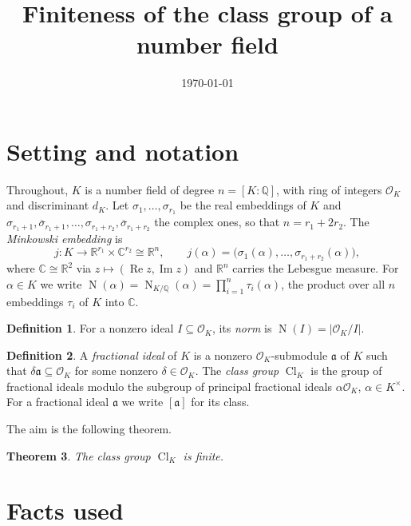 \documentclass[11pt]{amsart}
\title{Finiteness of the class group of a number field}
\date{\today}
\newtheorem{theorem}{Theorem}[section]
\theoremstyle{definition}
\newtheorem{definition}[theorem]{Definition}
\theoremstyle{remark}
\newcommand{\Q}{\mathbb{Q}}
\newcommand{\R}{\mathbb{R}}
\newcommand{\C}{\mathbb{C}}
\newcommand{\OK}{\mathcal{O}_K}
\newcommand{\Cl}{\operatorname{Cl}}
\newcommand{\Nm}{\operatorname{N}}
\begin{document}
\maketitle

\section{Setting and notation}\label{sec:setting}

Throughout, $K$ is a number field of degree $n = [K:\Q]$, with ring of
integers $\OK$ and discriminant $d_K$. Let $\sigma_1, \dots, \sigma_{r_1}$ be
the real embeddings of $K$ and
$\sigma_{r_1+1}, \overline{\sigma}_{r_1+1}, \dots, \sigma_{r_1+r_2},
\overline{\sigma}_{r_1+r_2}$ the complex ones, so that $n = r_1 + 2r_2$. The
\emph{Minkowski embedding} is
\[
  j \colon K \to \R^{r_1} \times \C^{r_2} \cong \R^n, \qquad
  j(\alpha) = \bigl(\sigma_1(\alpha), \dots, \sigma_{r_1+r_2}(\alpha)\bigr),
\]
where $\C \cong \R^2$ via $z \mapsto (\operatorname{Re} z, \operatorname{Im} z)$
and $\R^n$ carries the Lebesgue measure. For $\alpha \in K$ we write
$\Nm(\alpha) = \Nm_{K/\Q}(\alpha) = \prod_{i=1}^{n} \tau_i(\alpha)$, the
product over all $n$ embeddings $\tau_i$ of $K$ into $\C$.

\begin{definition}\label{def:norm}
For a nonzero ideal $I \subseteq \OK$, its \emph{norm} is
$\Nm(I) = |\OK / I|$.
\end{definition}

\begin{definition}\label{def:classgroup}
A \emph{fractional ideal} of $K$ is a nonzero $\OK$-submodule $\mathfrak{a}$ of
$K$ such that $\delta\mathfrak{a} \subseteq \OK$ for some nonzero
$\delta \in \OK$. The \emph{class group} $\Cl_K$ is the group of fractional
ideals modulo the subgroup of principal fractional ideals $\alpha\OK$,
$\alpha \in K^\times$. For a fractional ideal $\mathfrak{a}$ we write
$[\mathfrak{a}]$ for its class.
\end{definition}

The aim is the following theorem.

\begin{theorem}\label{thm:finite}
The class group $\Cl_K$ is finite.
\end{theorem}

\section{Facts used}\label{sec:facts}
\end{document}
